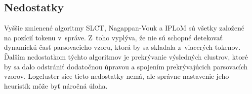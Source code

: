 \subsection{Nedostatky}
Vyššie zmienené algoritmy SLCT, Nagappan-Vouk a IPLoM sú všetky založené na pozícií tokenu v~správe. Z~toho vyplýva, že nie sú schopné detekovať dynamickú časť parsovacieho vzoru, ktorá by sa skladala z~viacerých tokenov. Ďalším nedostatkom týchto algoritmov je prekrývanie výsledných clustrov, ktoré by sa dalo odstrániť dodatočnou úpravou a spojením prekrývajúcich parsovacích vzorov. Logcluster síce tieto nedostatky nemá, ale správne nastavenie jeho heuristík môže byť náročná úloha.